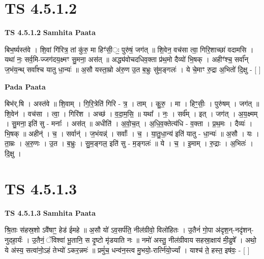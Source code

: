 \documentclass[17pt]{extarticle}
\begin{document}
\section*{ TS 4.5.1.2 }

\textbf{TS 4.5.1.2 } \newline
\textbf{Samhita Paata} \newline

बिभ॒र्ष्यस्त॑वे । शि॒वां गि॑रित्र॒ तां कु॑रु॒ मा हिꣳ॑सी॒ः॒ पुरु॑षं॒ जग॑त् ॥        शि॒वेन॒ वच॑सा त्वा॒ गिरि॒शाच्छा॑ वदामसि ।यथा॑ नः॒ सर्व॒मि-ज्जग॑दय॒क्ष्मꣳ सु॒मना॒ अस॑त् ॥                             अद्ध्य॑वोचदधिव॒क्ता प्र॑थ॒मो दैव्यो॑ भि॒षक् । अहीꣳ॑श्च॒॒ सर्वा᳚न् ज॒भंय॒न्थ् सर्वा᳚श्च यातु धा॒न्यः॑ ॥                          अ॒सौ यस्ता॒म्रो अ॑रु॒ण उ॒त ब॒भ्रुः सु॑म॒ङ्गलः॑ । ये चे॒माꣳ रु॒द्रा अ॒भितो॑ दि॒क्षु - [  ] \newline

\textbf{Pada Paata} \newline

बिभ॑र्.षि । अस्त॑वे ॥ शि॒वाम् । गि॒रि॒त्रेति॑ गिरि - त्र॒ । ताम् । कु॒रु॒ । मा । हिꣳ॒॒सीः॒ । पुरु॑षम् । जग॑त् ॥ शि॒वेन॑ । वच॑सा । त्वा॒ । गिरि॑श । अच्छ॑ । व॒दा॒म॒सि॒ ॥ यथा᳚ । नः॒ । सर्व᳚म् । इत् । जग॑त् । अ॒य॒क्ष्मम् । सु॒मना॒ इति॑ सु - मनाः᳚ । अस॑त् ॥ अधीति॑ । अ॒वो॒च॒त् । अ॒धि॒व॒क्तेत्य॑धि - व॒क्ता । प्र॒थ॒मः । दैव्यः॑ । भि॒षक् ॥ अहीन्॑ । च॒ । सर्वान्॑ । ज॒भंयन्न्॑ । सर्वाः᳚ । च॒ । या॒तु॒धा॒न्य॑ इति॑ यातु - धा॒न्यः॑ ॥ अ॒सौ । यः । ता॒म्रः । अ॒रु॒णः । उ॒त । ब॒भ्रुः । सु॒म॒ङ्गल॒ इति॑ सु - म॒ङ्गलः॑ ॥ ये । च॒ । इ॒माम् । रु॒द्राः । अ॒भितः॑ । दि॒क्षु ।  \newline




\section*{ TS 4.5.1.3 }

\textbf{TS 4.5.1.3 } \newline
\textbf{Samhita Paata} \newline

श्रि॒ताः स॑हस्र॒शो ऽवै॑षाꣳ॒॒ हेड॑ ईमहे ॥ अ॒सौ यो॑ ऽव॒सर्प॑ति॒ नील॑ग्रीवो॒ विलो॑हितः । उ॒तैनं॑ गो॒पा अ॑दृश॒न्-नदृ॑शन्-नुदहा॒र्यः॑ । उ॒तैनं॒ ॅविश्वा॑ भू॒तानि॒ स दृ॒ष्टो मृ॑डयाति नः ॥                               नमो॑ अस्तु॒ नील॑ग्रीवाय सहस्रा॒क्षाय॑ मी॒ढुषे᳚ । अथो॒ ये अ॑स्य॒ सत्वा॑नो॒ऽहं तेभ्यो॑ ऽकर॒न्नमः॑ ॥                                   प्रमुं॑च॒ धन्व॑न॒स्त्व मु॒भयो॒-रार्त्नि॑यो॒र्ज्यां । याश्च॑ ते॒ हस्त॒ इष॑वः॒ - [  ] \newline
\end{document}
